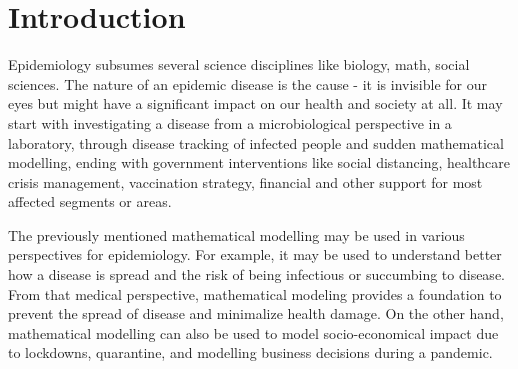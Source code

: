 \documentclass[
  digital, %
  oneside, %
  lof,     %
  lot,     %
]{fithesis4}
\begin{document}

\chapter*{Introduction}

Epidemiology subsumes several science disciplines like biology, math, social sciences.
The nature of an epidemic disease is the cause - it is invisible for our eyes but might have a significant impact on our health and society at all.
It may start with investigating a disease from a microbiological perspective in a laboratory, through disease tracking of infected people and sudden mathematical modelling, ending with government interventions like social distancing, healthcare crisis management, vaccination strategy, financial and other support for most affected segments or areas.

The previously mentioned mathematical modelling may be used in various perspectives for epidemiology. 
For example, it may be used to understand better how a disease is spread and the risk of being infectious or succumbing to disease.
From that medical perspective, mathematical modeling provides a foundation to prevent the spread of disease and minimalize health damage.
On the other hand, mathematical modelling can also be used to model socio-economical impact due to lockdowns, quarantine, and modelling business decisions during a pandemic.
\end{document}
